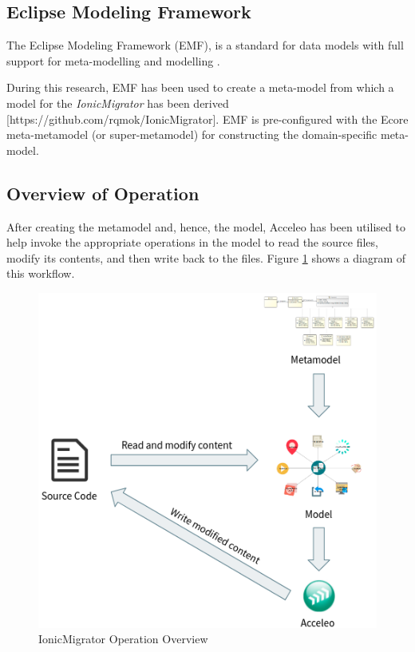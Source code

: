 \documentclass[conference]{IEEEtran}
\begin{document}
\subsection{Eclipse Modeling Framework}

The Eclipse Modeling Framework (EMF), is a standard for data models with full support for meta-modelling and modelling \cite{b11}.

During this research, EMF has been used to create a meta-model from which a model for the \textit{IonicMigrator} has been derived [https://github.com/rqmok/IonicMigrator]. EMF is pre-configured with the Ecore meta-metamodel (or super-metamodel) for constructing the domain-specific meta-model.

\subsection{Overview of Operation}

After creating the metamodel and, hence, the model, Acceleo has been utilised to help invoke the appropriate operations in the model to read the source files, modify its contents, and then write back to the files. Figure \ref{fig:operation} shows a diagram of this workflow.

\begin{figure}[htbp]
\centerline{\includegraphics[width=\linewidth,keepaspectratio]{workflow.png}}
\caption{IonicMigrator Operation Overview}
\label{fig:operation}
\end{figure}
\end{document}
